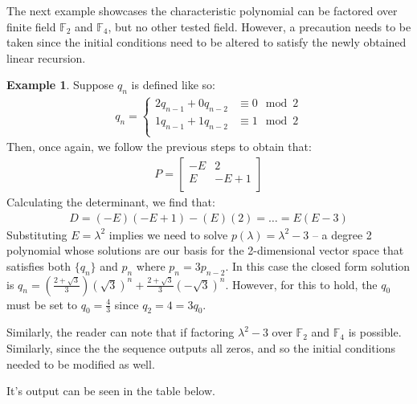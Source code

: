\documentclass[a4paper]{article}
\theoremstyle{definition}
\newtheorem{example}{Example}[section]
\begin{document}
The next example showcases the characteristic polynomial can be factored over finite field
$\mathbb{F}_2$ and $\mathbb{F}_4$, but no other tested field. However, a precaution needs to be taken
since the initial conditions need to be altered to satisfy the newly obtained linear recursion. 
\\
\begin{example}
Suppose $q_n$ is defined like so:
\begin{align*}
q_n=
\begin{cases}
2q_{n-1}+0q_{n-2} & \equiv 0 \mod 2 \\
1q_{n-1}+1q_{n-2} & \equiv 1 \mod 2 \\
\end{cases}
\end{align*}
Then, once again, we follow the previous steps to obtain that:
\begin{align*}
P=
\begin{bmatrix}
   -E &    2 \\
    E & -E+1 \\
\end{bmatrix}
\end{align*}
Calculating the determinant, we find that:
\begin{align*}
D=(-E)(-E+1)-(E)(2)=\ldots=E(E-3)
\end{align*}
Substituting $E=\lambda^2$ implies we need to solve $p(\lambda)=\lambda^2-3$ -- a degree 2 polynomial
whose solutions are our basis for the 2-dimensional vector space that satisfies both $\{q_n\}$ and
${p_n}$ where $p_n=3p_{n-2}$. In this case the closed form solution is
$q_n=\left(\frac{2+\sqrt{3}}{3}\right)(\sqrt{3})^n+\frac{2+\sqrt{3}}{3}(-\sqrt{3})^n$. However, for this
to hold, the $q_0$ must be set to $q_0=\frac{4}{3}$ since $q_2={4}=3q_0$. 

Similarly, the reader can note that if factoring $\lambda^2-3$ over $\mathbb{F}_2$ and $\mathbb{F}_4$ is
possible. Similarly, since the the sequence outputs all zeros, and so the initial conditions needed to
be modified as well. 

It's output can be seen in the table below.


\end{example}
\end{document}
